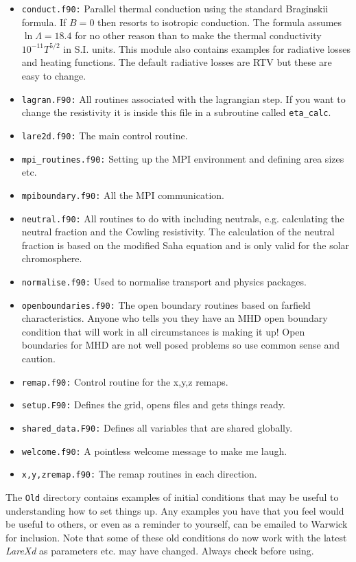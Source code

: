 \documentclass[11pt]{article}
\begin{document}
\begin{itemize}
  \item{\texttt{conduct.f90:}} Parallel thermal conduction using the standard Braginskii formula. If $B=0$ then resorts to isotropic conduction. The formula assumes $\ln\Lambda=18.4$ for no other reason than to make the thermal conductivity $10^{-11}T^{5/2}$ in S.I. units. This module also contains examples for radiative losses and heating functions. The default radiative losses are RTV but these are easy to change.
  \item{\texttt{lagran.F90:}} All routines associated with the lagrangian step. If you want to change the resistivity it is inside this file in a subroutine called \texttt{eta\_calc}.
  \item{\texttt{lare2d.f90:}} The main control routine.
  \item{\texttt{mpi\_routines.f90:}} Setting up the MPI environment and defining area sizes etc.
  \item{\texttt{mpiboundary.f90:}} All the MPI communication.
  \item{\texttt{neutral.f90:}} All routines to do with including neutrals, e.g. calculating the neutral fraction and the Cowling resistivity. The calculation of the neutral fraction is based on the modified Saha equation and is only valid for the solar chromosphere.
  \item{\texttt{normalise.f90:}} Used to normalise transport and physics packages.
  \item{\texttt{openboundaries.f90:}} The open boundary routines based on farfield characteristics. Anyone who tells you they have an MHD open boundary condition that will work in all circumstances is making it up! Open boundaries for MHD are not well posed problems so use common sense and caution.
  \item{\texttt{remap.f90:}} Control routine for the x,y,z remaps.
  \item{\texttt{setup.F90:}} Defines the grid, opens files and gets things ready.
  \item{\texttt{shared\_data.F90:}} Defines all variables that are shared globally.
  \item{\texttt{welcome.f90:}} A pointless welcome message to make me laugh.
  \item{\texttt{x,y,zremap.f90:}} The remap routines in each direction.
\end{itemize}

The \texttt{Old} directory contains examples of initial conditions that may be useful to understanding how to set things up. Any examples you have that you feel would be useful to others, or even as a reminder to yourself, can be emailed to Warwick for inclusion. Note that some of these old conditions do now work with the latest {\it LareXd} as parameters etc. may have changed. Always check before using.
\end{document}

